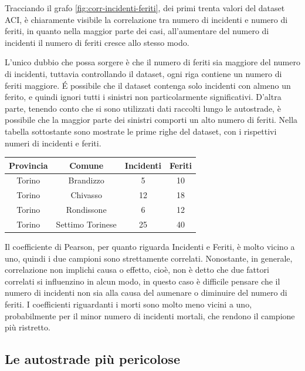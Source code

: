 \documentclass[a4paper,12pt]{report}
\begin{document}
Tracciando il grafo \ref{fig:corr-incidenti-feriti}, dei primi trenta valori 
del dataset ACI, è chiaramente visibile la correlazione tra 
numero di incidenti e numero di feriti, in quanto nella maggior parte dei casi, 
all'aumentare del numero di incidenti il numero di feriti cresce allo stesso modo.

L'unico dubbio che possa sorgere è che il numero di feriti sia maggiore del 
numero di incidenti, tuttavia controllando il dataset, ogni 
riga contiene un numero di feriti maggiore.
\'E possibile che il dataset contenga solo incidenti con almeno un ferito, 
e quindi ignori tutti i sinistri non particolarmente significativi.
D'altra parte, tenendo conto che si sono utilizzati dati raccolti lungo 
le autostrade, è possibile che la maggior parte dei sinistri comporti 
un alto numero di feriti. 
Nella tabella sottostante sono  mostrate le prime righe del dataset, con i 
rispettivi numeri di incidenti e feriti. 

\begin{center}
    \def\arraystretch{1.5}%
    \begin{tabular}{ |c|c|c|c| } 
    \hline
    Provincia & Comune & Incidenti & Feriti \\ 
    \hline
    \rowcolor{TableGray}
    Torino & Brandizzo & 5 & 10\\
    Torino & Chivasso & 12 & 18\\
    \rowcolor{TableGray}
    Torino & Rondissone & 6 & 12\\
    Torino & Settimo Torinese & 25 & 40\\
    \hline
    \end{tabular}
\end{center}

Il coefficiente di Pearson, per quanto riguarda Incidenti e Feriti, 
è molto vicino a uno, quindi i due campioni sono strettamente correlati.
Nonostante, in generale, correlazione non implichi causa o effetto, cioè, non 
è detto che due fattori correlati si influenzino in alcun modo, in questo caso è 
difficile pensare che il numero di incidenti non sia alla causa del aumenare o diminuire 
del numero di feriti.
I coefficienti riguardanti i morti sono molto meno vicini a uno, probabilmente 
per il minor numero di incidenti mortali, che rendono il campione più ristretto.

\subsection{Le autostrade più pericolose}
\end{document}
